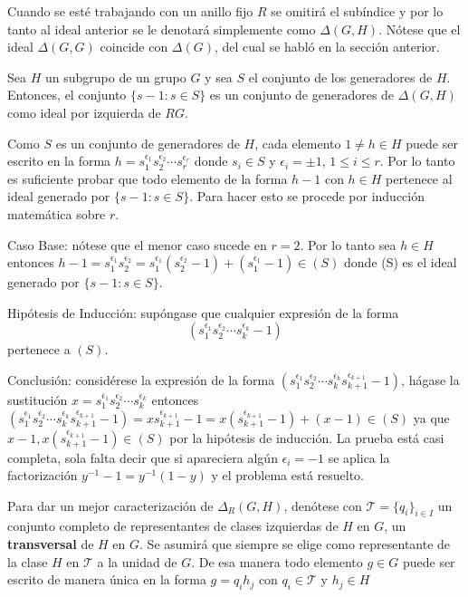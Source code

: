 Cuando se esté trabajando con un anillo fijo $R$ se omitirá el subíndice y por lo tanto al ideal anterior se le denotará simplemente como $\Delta(G,H)$. Nótese que el ideal $\Delta(G,G)$ coincide con $\Delta(G)$, del cual se habló en la sección anterior.
\begin{lema}
Sea $H$ un subgrupo de un grupo $G$ y sea $S$ el conjunto de los generadores de $H$. Entonces, el conjunto $\{ s-1 : s \in S \}$ es un conjunto de generadores de $\Delta (G,H) $ como ideal por izquierda de $RG$.
\end{lema}
\begin{proof*}
Como $S$ es un conjunto de generadores de $H$, cada elemento $1 \neq h \in H$ puede ser escrito en la forma $h=s_1^{\epsilon_1} s_2^{\epsilon_2} \cdots s_r^{\epsilon_r} $ donde $s_i \in S$ y $\epsilon_i =\pm 1$, $1 \leq i \leq r$. Por lo tanto es suficiente probar que todo elemento de la forma $h-1$ con $h \in H$  pertenece al ideal generado por $\{s-1 : s \in S \}$. Para hacer esto se procede por inducción matemática sobre $r$. 

Caso Base: nótese que el menor caso sucede en $r =2$. Por lo tanto sea $h \in H$ entonces $h-1 = s_1^{\epsilon_1} s_2^{\epsilon_2} = s_1^{\epsilon_1}( s_2^{\epsilon_2} -1 ) + ( s_1^{\epsilon_1} -1 ) \in (S)  $ donde (S) es el ideal generado por $\{ s-1 : s \in S \}$.

Hipótesis de Inducción: supóngase que cualquier expresión de la forma \[(s_1^{\epsilon_1} s_2^{\epsilon_2} \cdots s_k^{\epsilon_k} -1)\]
pertenece a $(S)$.


Conclusión: considérese la expresión de la forma $ (s_1^{\epsilon_1} s_2^{\epsilon_2} \cdots s_k^{\epsilon_k}s_{k+1}^{\epsilon_{k+1}} -1) $, hágase la sustitución $x =  s_1^{\epsilon_1} s_2^{\epsilon_2} \cdots s_k^{\epsilon_k} $ entonces $ (s_1^{\epsilon_1} s_2^{\epsilon_2} \cdots s_k^{\epsilon_k}s_{k+1}^{\epsilon_{k+1}} -1)  = x s_{k+1}^{\epsilon_{k+1}} -1 = x( s_{k+1}^{\epsilon_{k+1}} -1 ) + (x-1) \in (S) $ ya que $x-1, x( s_{k+1}^{\epsilon_{k+1}} -1 ) \in (S)$ por la hipótesis de inducción. La prueba está casi completa, sola falta decir que si apareciera algún $\epsilon_i = -1$ se aplica la factorización $y^{-1}-1 = y^{-1}(1-y)$ y el problema está resuelto.
\end{proof*}
Para dar un mejor caracterización de $\Delta_R (G,H)$, denótese con $\mathcal{T} = \{q_i\}_{i \in I}$ un conjunto completo de representantes de clases izquierdas de $H$ en $G$, un \textbf{transversal} de $H$ en $G$. Se asumirá que siempre se elige como representante de la clase $H$ en $\mathcal{T}$ a la unidad de $G$. De esa manera todo elemento $g \in G$ puede ser escrito de manera única en la forma $g = q_ih_j$ con $q_i \in \mathcal{T}$ y $h_j \in H$
